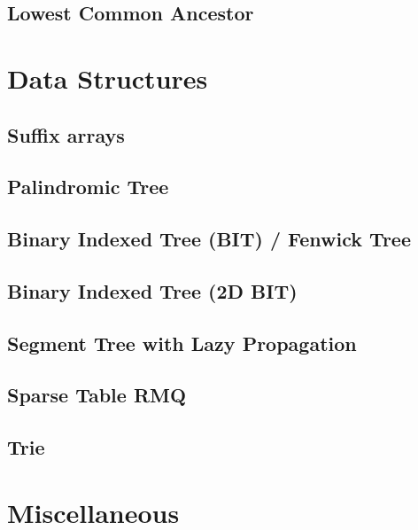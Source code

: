 \documentclass[10pt]{extarticle}
\begin{document}
\begin{multicols*}{2}
\subsection{Lowest Common Ancestor} 



\section{Data Structures}

\subsection{Suffix arrays} %


\subsection{Palindromic Tree} %


\subsection{Binary Indexed Tree (BIT) / Fenwick Tree} %


\subsection{Binary Indexed Tree (2D BIT)} %


\subsection{Segment Tree with Lazy Propagation} %


\subsection{Sparse Table RMQ} %


\subsection{Trie} %


\section{Miscellaneous}


\end{multicols*}
\end{document}
